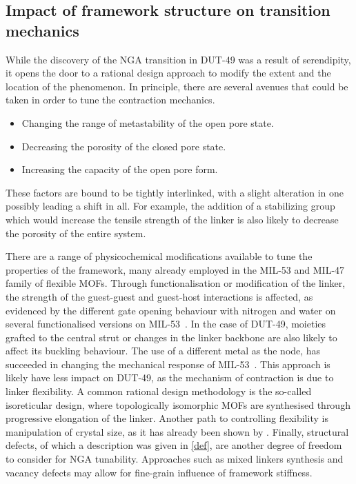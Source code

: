
\subsection{Impact of framework structure on transition mechanics}%
\label{dut:comparison}

While the discovery of the NGA transition in DUT-49 was a result 
of serendipity, it opens the door to a rational design approach 
to modify the extent and the location of the phenomenon. In principle,
there are several avenues that could be taken in order to tune the 
contraction mechanics.
\begin{itemize}
    \item Changing the range of metastability of the open pore state.
    \item Decreasing the porosity of the closed pore state.
    \item Increasing the capacity of the open pore form.
\end{itemize}
These factors are bound to be tightly interlinked, with a slight 
alteration in one possibly leading a shift in all. For example, the 
addition of a stabilizing group which would increase the tensile 
strength of the linker is also likely to decrease the porosity 
of the entire system.

There are a range of physicochemical modifications available to 
tune the properties of the framework, many already employed in the
MIL-53 and MIL-47 family of flexible MOFs.
Through functionalisation or modification of the linker, the strength of the guest-guest
and guest-host interactions is affected, as evidenced by the different
gate opening behaviour with nitrogen and water on several functionalised
versions on MIL-53~\cite{biswasNewFunctionalizedFlexible2011}.
In the case of DUT-49, moieties grafted to the central strut or changes
in the linker backbone are also likely to affect its buckling behaviour.
The use of a different metal as the node, has succeeded in changing the 
mechanical response of MIL-53~\cite{yotImpactMetalCentre2016}. This 
approach is likely have less impact on DUT-49, as the mechanism of 
contraction is due to linker flexibility.
A common rational design methodology is the so-called isoreticular design,
where topologically isomorphic MOFs are synthesised through progressive elongation
of the linker. Another path to controlling flexibility is manipulation of crystal 
size, as it has already been shown by \citet{krauseEffectCrystalliteSize2018}.
Finally, structural defects, of which a description was given 
in \autoref{def}, are another degree of freedom to consider for NGA 
tunability. Approaches such as mixed linkers synthesis and vacancy defects
may allow for fine-grain influence of framework stiffness.

